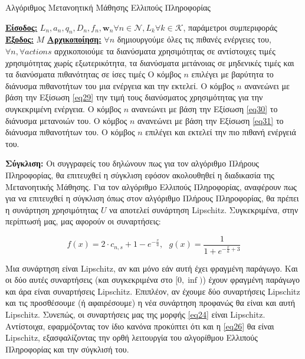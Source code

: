 \begin{algorithm}[h]
\caption{Αλγόριθμος Μετανοητική Μάθησης Ελλιπούς Πληροφορίας} \label{algorithm 6}
\begin{algorithmic}[1]
\STATE \textbf{\underline{Είσοδος:}} ${L_n, a_n, q_n, D_n, f_n, \mathbf{w}_n}{\forall n\in \mathcal{N}}, {L_k}{\forall k \in \mathcal{K}}$, παράμετροι συμπεριφοράς
\STATE \textbf{\underline{Έξοδος:}}  $M$
\STATE \textbf{\underline{Αρχικοποίηση:}} $\forall n$ δημιουργούμε όλες τις πιθανές ενέργειες του, $\forall n, \forall actions$ αρχικοποιούμε τα διανύσματα χρησιμότητας σε αντίστοιχες τιμές χρησιμότητας χωρίς εξωτερικότητα, τα διανύσματα μετάνοιας σε μηδενικές τιμές και τα διανύσματα πιθανότητας σε ίσες τιμές
\STATE Ο κόμβος $n$ επιλέγει με βαρύτητα το διάνυσμα πιθανοτήτων του μια ενέργεια και την εκτελεί.
\ENDFOR
{}
\STATE Ο κόμβος $n$ ανανεώνει με βάση την Εξίσωση \ref{eq29} την τιμή τους διανύσματος χρησιμότητας για την συγκεκριμένη ενέργεια.
\STATE Ο κόμβος $n$ ανανεώνει με βάση την Εξίσωση \ref{eq30} το διάνυσμα μετανοιών του.
\STATE Ο κόμβος $n$ ανανεώνει με βάση την Εξίσωση \ref{eq31} το διάνυσμα πιθανοτήτων του.
\ENDFOR
\ENDWHILE
{}
\STATE Ο κόμβος $n$ επιλέγει και εκτελεί την πιο πιθανή ενέργειά του.
\ENDFOR
\end{algorithmic}
\end{algorithm}
\vspace{-7pt}

\textbf{Σύγκλιση:} Οι συγγραφείς του  δηλώνουν πως για τον αλγόριθμο Πλήρους Πληροφορίας, θα επιτευχθεί η σύγκλιση εφόσον ακολουθηθεί η διαδικασία της Μετανοητικής Μάθησης. Για τον αλγόριθμο Ελλιπούς Πληροφορίας, αναφέρουν πως για να επιτευχθεί η σύγκλιση όπως στον αλγόριθμο Πλήρους Πληροφορίας, θα πρέπει η συνάρτηση χρησιμότητας $U$ να αποτελεί συνάρτηση Lipschitz. Συγκεκριμένα, στην περίπτωσή μας, μας αφορούν οι συναρτήσεις:

\[f(x) = 2 \cdot c_{n,s} + 1 - e^{-\frac{x}{a}}, \>\>\> g(x) = \frac{1}{1 + e^{-\frac{x}{a} + 3}}\]

Μια συνάρτηση είναι Lipschitz, αν και μόνο εάν αυτή έχει φραγμένη παράγωγο. Και οι δύο αυτές συναρτήσεις (και συγκεκριμένα στο $[0,\inf)$) έχουν φραγμένη παράγωγο και άρα είναι συναρτήσεις Lipschitz. Επιπλέον, αν έχουμε δύο συναρτήσεις Lipschitz και τις προσθέσουμε (ή αφαιρέσουμε) η νέα συνάρτηση προφανώς θα είναι και αυτή Lipschitz. Συνεπώς, οι συναρτήσεις μας της μορφής \ref{eq24} είναι Lipschitz. Αντίστοιχα, εφαρμόζοντας τον ίδιο κανόνα προκύπτει ότι και η \ref{eq26} θα είναι Lipschitz, εξασφαλίζοντας την ορθή λειτουργία του αλγορίθμου Ελλιπούς Πληροφορίας και την σύγκλισή του.


